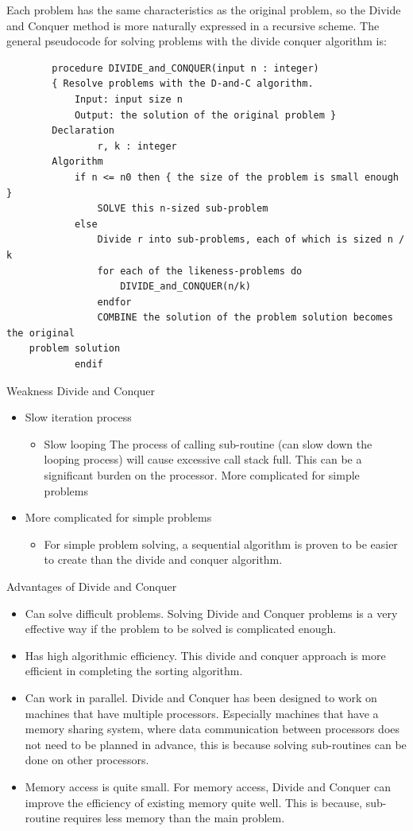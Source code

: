 \documentclass[12pt,titlepage]{article}
\begin{document}
Each problem has the same characteristics as the original problem, so the Divide and Conquer method is more naturally expressed in a recursive scheme. The general pseudocode for solving problems with the divide conquer algorithm is:
\begin{verbatim}
        procedure DIVIDE_and_CONQUER(input n : integer)
        { Resolve problems with the D-and-C algorithm.
            Input: input size n
            Output: the solution of the original problem }
        Declaration
                r, k : integer
        Algorithm
            if n <= n0 then { the size of the problem is small enough }
                SOLVE this n-sized sub-problem
            else
                Divide r into sub-problems, each of which is sized n / k
                for each of the likeness-problems do
                    DIVIDE_and_CONQUER(n/k)
                endfor
                COMBINE the solution of the problem solution becomes the original
    problem solution
            endif

\end{verbatim}
Weakness Divide and Conquer

\begin{itemize}
    \item Slow iteration process
    \begin{itemize}
        \item Slow looping The process of calling sub-routine (can slow down the looping process) will cause excessive call stack full. This can be a significant burden on the processor. More complicated for simple problems
    \end{itemize}
    \item More complicated for simple problems
    \begin{itemize}
        \item For simple problem solving, a sequential algorithm is proven to be easier to create than the divide and conquer algorithm.
    \end{itemize}
\end{itemize}

Advantages of Divide and Conquer

\begin{itemize}
    \item Can solve difficult problems. Solving Divide and Conquer problems is a very effective way if the problem to be solved is complicated enough.
    \item Has high algorithmic efficiency. This divide and conquer approach is more efficient in completing the sorting algorithm.
    \item Can work in parallel. Divide and Conquer has been designed to work on machines that have multiple processors. Especially machines that have a memory sharing system, where data communication between processors does not need to be planned in advance, this is because solving sub-routines can be done on other processors.
    \item Memory access is quite small. For memory access, Divide and Conquer can improve the efficiency of existing memory quite well. This is because, sub-routine requires less memory than the main problem.
\end{itemize}
\end{document}
